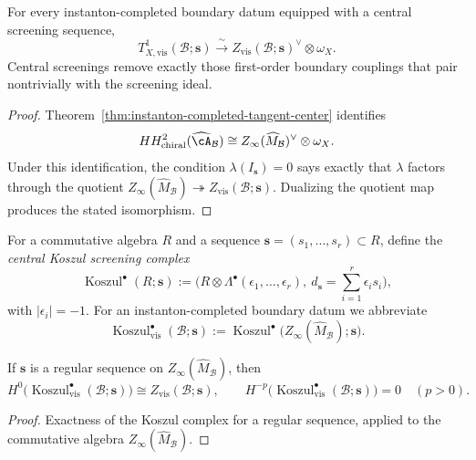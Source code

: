\begin{theorem}
\label{thm:screened-tangent-center}
For every instanton-completed boundary datum equipped with a central screening sequence,
\[
T^1_{X,\mathrm{vis}}(\mathcal B;\mathbf s)
\xrightarrow{\ \sim\ }
Z_{\mathrm{vis}}(\mathcal B;\mathbf s)^{\vee}\otimes \omega_X.
\]
Central screenings remove exactly those first-order boundary couplings that pair
nontrivially with the screening ideal.
\end{theorem}

\begin{proof}
Theorem~\ref{thm:instanton-completed-tangent-center} identifies
\[
HH^2_{\mathrm{chiral}}(\widehat{\cA}_{\mathcal B})
\cong Z_{\infty}(\widehat M_{\mathcal B})^{\vee}\otimes \omega_X.
\]
Under this identification, the condition $\lambda(I_{\mathbf s})=0$ says exactly that $\lambda$ factors through the quotient
$Z_{\infty}(\widehat M_{\mathcal B})\twoheadrightarrow Z_{\mathrm{vis}}(\mathcal B;\mathbf s)$. Dualizing the quotient map
produces the stated isomorphism.
\end{proof}

\begin{definition}
\label{def:central-koszul-screening-complex}
For a commutative algebra $R$ and a sequence $\mathbf s=(s_1,\dots,s_r)\subset R$, define the
\emph{central Koszul screening complex}
\[
\operatorname{Koszul}^{\bullet}(R;\mathbf s)
:=
\bigl(R\otimes \Lambda^{\bullet}(\epsilon_1,\dots,\epsilon_r),\ d_{\mathbf s}=\sum_{i=1}^r \epsilon_i s_i\bigr),
\]
with $|\epsilon_i|=-1$.
For an instanton-completed boundary datum we abbreviate
\[
\operatorname{Koszul}^{\bullet}_{\mathrm{vis}}(\mathcal B;\mathbf s)
:=
\operatorname{Koszul}^{\bullet}\bigl(Z_{\infty}(\widehat M_{\mathcal B});\mathbf s\bigr).
\]
\end{definition}

\begin{proposition}
\label{prop:koszul-identification-visible-center}
If $\mathbf s$ is a regular sequence on $Z_{\infty}(\widehat M_{\mathcal B})$, then
\[
H^0\bigl(\operatorname{Koszul}^{\bullet}_{\mathrm{vis}}(\mathcal B;\mathbf s)\bigr)
\cong Z_{\mathrm{vis}}(\mathcal B;\mathbf s),
\qquad
H^{-p}\bigl(\operatorname{Koszul}^{\bullet}_{\mathrm{vis}}(\mathcal B;\mathbf s)\bigr)=0\quad (p>0).
\]
\end{proposition}

\begin{proof}
Exactness of the Koszul complex for a regular sequence, applied to the commutative
algebra $Z_{\infty}(\widehat M_{\mathcal B})$.
\end{proof}

